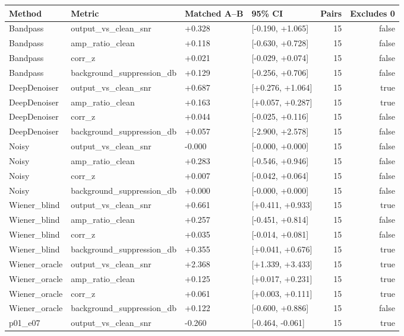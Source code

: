 \begin{tabular}{llllrr}
\toprule
Method & Metric & Matched A--B & 95\% CI & Pairs & Excludes 0 \\
\midrule
Bandpass & output\_vs\_clean\_snr & +0.328 & [-0.190, +1.065] & 15 & false \\
Bandpass & amp\_ratio\_clean & +0.118 & [-0.630, +0.728] & 15 & false \\
Bandpass & corr\_z & +0.021 & [-0.029, +0.074] & 15 & false \\
Bandpass & background\_suppression\_db & +0.129 & [-0.256, +0.706] & 15 & false \\
DeepDenoiser & output\_vs\_clean\_snr & +0.687 & [+0.276, +1.064] & 15 & true \\
DeepDenoiser & amp\_ratio\_clean & +0.163 & [+0.057, +0.287] & 15 & true \\
DeepDenoiser & corr\_z & +0.044 & [-0.025, +0.116] & 15 & false \\
DeepDenoiser & background\_suppression\_db & +0.057 & [-2.900, +2.578] & 15 & false \\
Noisy & output\_vs\_clean\_snr & -0.000 & [-0.000, +0.000] & 15 & false \\
Noisy & amp\_ratio\_clean & +0.283 & [-0.546, +0.946] & 15 & false \\
Noisy & corr\_z & +0.007 & [-0.042, +0.064] & 15 & false \\
Noisy & background\_suppression\_db & +0.000 & [-0.000, +0.000] & 15 & false \\
Wiener\_blind & output\_vs\_clean\_snr & +0.661 & [+0.411, +0.933] & 15 & true \\
Wiener\_blind & amp\_ratio\_clean & +0.257 & [-0.451, +0.814] & 15 & false \\
Wiener\_blind & corr\_z & +0.035 & [-0.014, +0.081] & 15 & false \\
Wiener\_blind & background\_suppression\_db & +0.355 & [+0.041, +0.676] & 15 & true \\
Wiener\_oracle & output\_vs\_clean\_snr & +2.368 & [+1.339, +3.433] & 15 & true \\
Wiener\_oracle & amp\_ratio\_clean & +0.125 & [+0.017, +0.231] & 15 & true \\
Wiener\_oracle & corr\_z & +0.061 & [+0.003, +0.111] & 15 & true \\
Wiener\_oracle & background\_suppression\_db & +0.122 & [-0.600, +0.886] & 15 & false \\
p01\_e07 & output\_vs\_clean\_snr & -0.260 & [-0.464, -0.061] & 15 & true \\

\end{tabular}
